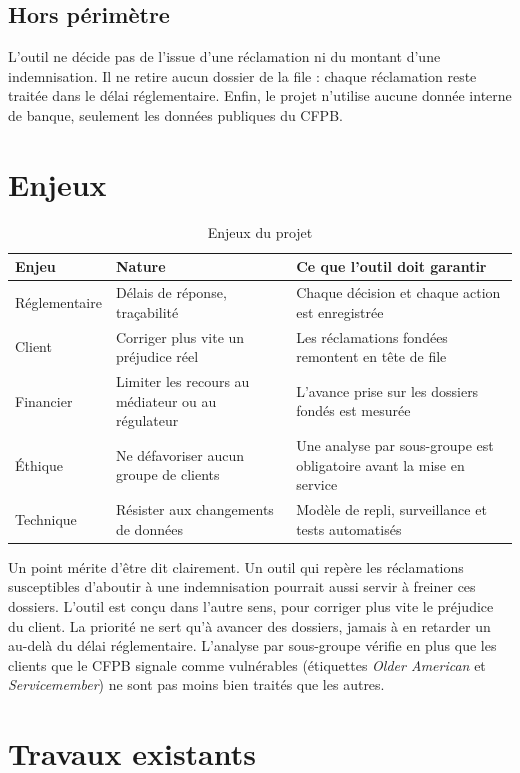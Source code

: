\documentclass[11pt,a4paper]{article}
\begin{document}
\subsection{Hors périmètre}

L'outil ne décide pas de l'issue d'une réclamation ni du montant d'une indemnisation. Il ne retire aucun dossier de la file : chaque réclamation reste traitée dans le délai réglementaire. Enfin, le projet n'utilise aucune donnée interne de banque, seulement les données publiques du CFPB.

\section{Enjeux}

\begin{table}[H]
\centering\small
\begin{tabularx}{\linewidth}{@{}l l Y@{}}
\toprule
Enjeu & Nature & Ce que l'outil doit garantir \\
\midrule
Réglementaire & Délais de réponse, traçabilité & Chaque décision et chaque action est enregistrée \\
Client & Corriger plus vite un préjudice réel & Les réclamations fondées remontent en tête de file \\
Financier & Limiter les recours au médiateur ou au régulateur & L'avance prise sur les dossiers fondés est mesurée \\
Éthique & Ne défavoriser aucun groupe de clients & Une analyse par sous-groupe est obligatoire avant la mise en service \\
Technique & Résister aux changements de données & Modèle de repli, surveillance et tests automatisés \\
\bottomrule
\end{tabularx}
\caption{Enjeux du projet}
\end{table}

Un point mérite d'être dit clairement. Un outil qui repère les réclamations susceptibles d'aboutir à une indemnisation pourrait aussi servir à freiner ces dossiers. L'outil est conçu dans l'autre sens, pour corriger plus vite le préjudice du client. La priorité ne sert qu'à avancer des dossiers, jamais à en retarder un au-delà du délai réglementaire. L'analyse par sous-groupe vérifie en plus que les clients que le CFPB signale comme vulnérables (étiquettes \emph{Older American} et \emph{Servicemember}) ne sont pas moins bien traités que les autres.

\section{Travaux existants}
\end{document}
